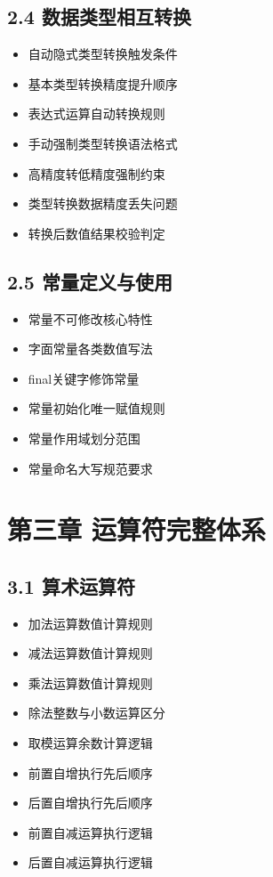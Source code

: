 \subsection{2.4 数据类型相互转换}
\begin{itemize}
\item 自动隐式类型转换触发条件
\item 基本类型转换精度提升顺序
\item 表达式运算自动转换规则
\item 手动强制类型转换语法格式
\item 高精度转低精度强制约束
\item 类型转换数据精度丢失问题
\item 转换后数值结果校验判定
\end{itemize}

\subsection{2.5 常量定义与使用}
\begin{itemize}
\item 常量不可修改核心特性
\item 字面常量各类数值写法
\item final关键字修饰常量
\item 常量初始化唯一赋值规则
\item 常量作用域划分范围
\item 常量命名大写规范要求
\end{itemize}

\section{第三章 运算符完整体系}
\subsection{3.1 算术运算符}
\begin{itemize}
\item 加法运算数值计算规则
\item 减法运算数值计算规则
\item 乘法运算数值计算规则
\item 除法整数与小数运算区分
\item 取模运算余数计算逻辑
\item 前置自增执行先后顺序
\item 后置自增执行先后顺序
\item 前置自减运算执行逻辑
\item 后置自减运算执行逻辑
\end{itemize}

